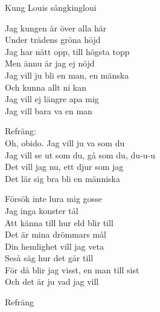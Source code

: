 \begin{song}{Kung Louis sång}{kingloui}
\begin{vers}
Jag kungen är över alla här\\
Under trädens gröna höjd\\
Jag har nått opp, till högsta topp\\
Men ännu är jag ej nöjd\\
Jag vill ju bli en man, en mänska\\
Och kunna allt ni kan\\
Jag vill ej längre apa mig\\
Jag vill bara va en man\\
\end{vers}
\begin{vers}
Refräng:\\
Oh, obido. Jag vill ju va som du\\
Jag vill se ut som du, gå som du, du-u-u\\
Det vill jag nu, ett djur som jag\\
Det lär sig bra bli en människa\\
\end{vers}
\begin{vers}
Försök inte lura mig gosse\\
Jag inga konster tål\\
Att känna till hur eld blir till\\
Det är mina drömmars mål\\
Din hemlighet vill jag veta\\
Seså säg hur det går till\\
För då blir jag visst, en man till sist\\
Och det är ju vad jag vill\\
\end{vers}
\begin{vers}
Refräng\\
\end{vers}
\end{song}

